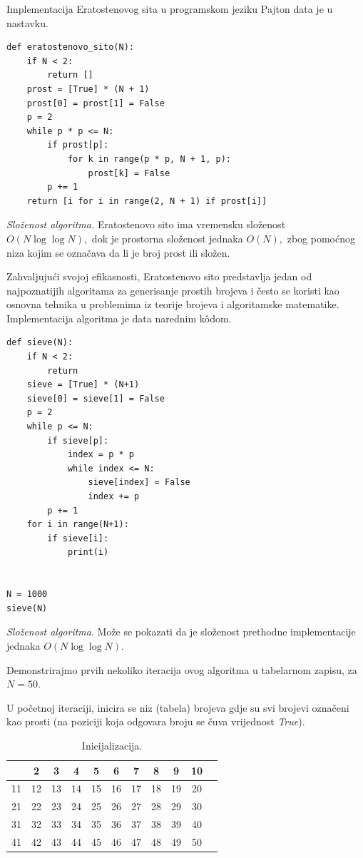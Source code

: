 Implementacija Eratostenovog sita u programskom jeziku Pajton data je u nastavku.

\begin{verbatim}
def eratostenovo_sito(N):
    if N < 2:
        return []
    prost = [True] * (N + 1)
    prost[0] = prost[1] = False
    p = 2
    while p * p <= N:
        if prost[p]:
            for k in range(p * p, N + 1, p):
                prost[k] = False
        p += 1
    return [i for i in range(2, N + 1) if prost[i]]
\end{verbatim}

\textit{Složenost algoritma.} Eratostenovo sito ima vremensku složenost $O(N \log \log N),$ dok je prostorna složenost jednaka $O(N),$ zbog pomoćnog niza kojim se označava da li je broj prost ili složen.

Zahvaljujući svojoj efikasnosti, Eratostenovo sito predstavlja jedan od najpoznatijih algoritama za generisanje prostih brojeva i često se koristi kao osnovna tehnika u problemima iz teorije brojeva i algoritamske matematike. Implementacija algoritma je data narednim k\^odom. 

\begin{verbatim}
def sieve(N):
    if N < 2:
        return
    sieve = [True] * (N+1)
    sieve[0] = sieve[1] = False
    p = 2
    while p <= N:
        if sieve[p]:
            index = p * p
            while index <= N:
                sieve[index] = False
                index += p
        p += 1
    for i in range(N+1):
        if sieve[i]:
            print(i)


N = 1000
sieve(N)
\end{verbatim}  
\textit{Složenost algoritma}.  Može se pokazati da je složenost prethodne implementacije jednaka $O(N \log\log N )$. 


Demonstrirajmo   prvih nekoliko iteracija ovog algoritma u tabelarnom zapisu, za $N=50.$ 

U početnoj iteraciji, inicira se niz (tabela) brojeva gdje su svi brojevi označeni kao prosti (na poziciji koja odgovara broju se čuva vrijednost \emph{True}).


\begin{table}[H]
	\centering
	\begin{tabular}{|c|c|c|c|c|c|c|c|c|c|c} \hline
       & 2 & 3 & 4 & 5 & 6 & 7 & 8 & 9 & 10 \\ \hline
    11 & 12 & 13 & 14 & 15 & 16 & 17 & 18 & 19 & 20 \\ \hline
    21 & 22 & 23 & 24 & 25 & 26 & 27 & 28 & 29 & 30 \\ \hline
    31 & 32 & 33 & 34 & 35 & 36 & 37 & 38 & 39 & 40 \\ \hline
    41 & 42 & 43 & 44 & 45 & 46 & 47 & 48 & 49 & 50 \\ \hline     
	\end{tabular}
    \caption{Inicijalizacija.} \label{eratosten-sieve-it-0}
\end{table}


